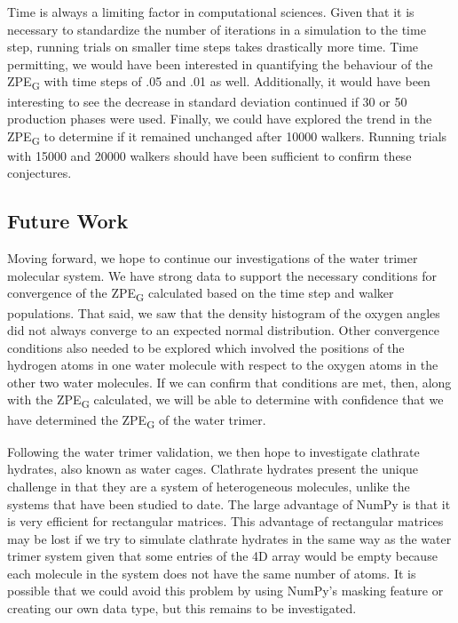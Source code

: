 \documentclass[journal=jacsat,manuscript=article]{achemso}
\begin{document}
Time is always a limiting factor in computational sciences. Given that it is necessary to standardize the number of iterations in a simulation to the time step, running trials on smaller time steps takes drastically more time. Time permitting, we would have been interested in quantifying the behaviour of the ZPE\textsubscript{G} with time steps of .05 and .01 as well. Additionally, it would have been interesting to see the decrease in standard deviation continued if 30 or 50 production phases were used. Finally, we could have explored the trend in the ZPE\textsubscript{G} to determine if it remained unchanged after 10000 walkers. Running trials with 15000 and 20000 walkers should have been sufficient to confirm these conjectures.

\subsection{Future Work}

Moving forward, we hope to continue our investigations of the water trimer molecular system. We have strong data to support the necessary conditions for convergence of the ZPE\textsubscript{G} calculated based on the time step and walker populations. That said, we saw that the density histogram of the oxygen angles did not always converge to an expected normal distribution. Other convergence conditions also needed to be explored which involved the positions of the hydrogen atoms in one water molecule with respect to the oxygen atoms in the other two water molecules. If we can confirm that conditions are met, then, along with the ZPE\textsubscript{G} calculated, we will be able to determine with confidence that we have determined the ZPE\textsubscript{G} of the water trimer. 

Following the water trimer validation, we then hope to investigate clathrate hydrates\cite{Englezos1993}, also known as water cages. Clathrate hydrates present the unique challenge in that they are a system of heterogeneous molecules, unlike the systems that have been studied to date. The large advantage of NumPy is that it is very efficient for rectangular matrices. This advantage of rectangular matrices may be lost if we try to simulate clathrate hydrates in the same way as the water trimer system given that some entries of the 4D array would be empty because each molecule in the system does not have the same number of atoms. It is possible that we could avoid this problem by using NumPy’s masking feature or creating our own data type, but this remains to be investigated. 
\end{document}
